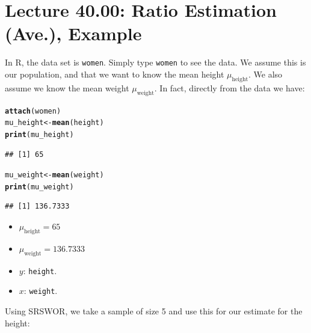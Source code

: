 \documentclass[oneside]{book}\usepackage[]{graphicx}\usepackage[dvipsnames,table,xcdraw]{xcolor}
\makeatletter
\newcommand{\hlstd}[1]{\textcolor[rgb]{0.345,0.345,0.345}{#1}}%
\newcommand{\hlkwb}[1]{\textcolor[rgb]{0.69,0.353,0.396}{#1}}%
\newcommand{\hlkwd}[1]{\textcolor[rgb]{0.737,0.353,0.396}{\textbf{#1}}}%
\newenvironment{kframe}{%
 \def\at@end@of@kframe{}%
 \ifinner\ifhmode%
  \def\at@end@of@kframe{\end{minipage}}%
  \begin{minipage}{\columnwidth}%
 \fi\fi%
 \def\FrameCommand##1{\hskip\@totalleftmargin \hskip-\fboxsep
 \colorbox{shadecolor}{##1}\hskip-\fboxsep
     \hskip-\linewidth \hskip-\@totalleftmargin \hskip\columnwidth}%
 \MakeFramed {\advance\hsize-\width
   \@totalleftmargin\z@ \linewidth\hsize
   \@setminipage}}%
 {\par\unskip\endMakeFramed%
 \at@end@of@kframe}
\newenvironment{knitrout}{}{} %
\newcommand{\code}[1]{\texttt{#1}}
\makeatother
\begin{document}
\section{Lecture 40.00: Ratio Estimation (Ave.), Example}
In R, the data set is \code{women}. Simply type \code{women} to see the data.
We assume this is our population, and that we want to know the mean
height $\mu_{\text{height}}$. We also assume we know the mean weight
$\mu_{\text{weight}}$. In fact, directly from the data we have:
\begin{knitrout}
\color{fgcolor}\begin{kframe}
\begin{alltt}
\hlkwd{attach}\hlstd{(women)}
\hlstd{mu_height} \hlkwb{<-} \hlkwd{mean}\hlstd{(height)}
\hlkwd{print}\hlstd{(mu_height)}
\end{alltt}
\begin{verbatim}
## [1] 65
\end{verbatim}
\begin{alltt}
\hlstd{mu_weight} \hlkwb{<-} \hlkwd{mean}\hlstd{(weight)}
\hlkwd{print}\hlstd{(mu_weight)}
\end{alltt}
\begin{verbatim}
## [1] 136.7333
\end{verbatim}
\end{kframe}
\end{knitrout}
\begin{itemize}
    \item $\mu_{\text{height}}=65$
    \item $\mu_{\text{weight}}=136.7333$
    \item $y$: \code{height}.
    \item $x$: \code{weight}.
\end{itemize}
Using SRSWOR, we take a sample of size 5 and use this for our estimate for
the height:
\end{document}
